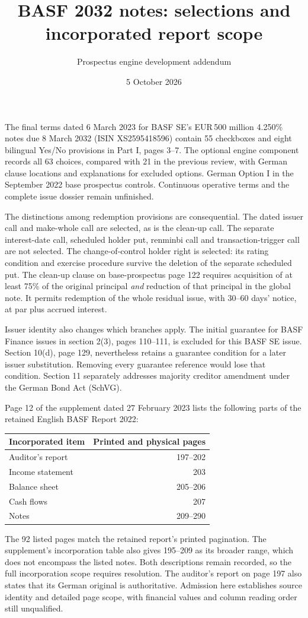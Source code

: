 \documentclass[11pt]{article}
\title{BASF 2032 notes: selections and incorporated report scope}
\author{Prospectus engine development addendum}
\date{5 October 2026}
\begin{document}
\maketitle
The final terms dated 6 March 2023 for BASF SE's EUR\,500 million
4.250\% notes due 8 March 2032 (ISIN XS2595418596) contain 55 checkboxes
and eight bilingual Yes/No provisions in Part I, pages 3--7. The optional
engine component records all 63 choices, compared with 21 in the previous
review, with German clause locations and explanations for excluded
options. German Option I in the September 2022 base prospectus controls.
Continuous operative terms and the complete issue dossier remain unfinished.

The distinctions among redemption provisions are consequential. The
dated issuer call and make-whole call are selected, as is the clean-up
call. The separate interest-date call, scheduled holder put, renminbi
call and transaction-trigger call are not selected. The
change-of-control holder right is selected: its rating condition and
exercise procedure survive the deletion of the separate scheduled put.
The clean-up clause on base-prospectus page 122 requires acquisition of
at least 75\% of the original principal \emph{and} reduction of that
principal in the global note. It permits redemption of the whole
residual issue, with 30--60 days' notice, at par plus accrued interest.

Issuer identity also changes which branches apply. The initial guarantee
for BASF Finance issues in section 2(3), pages 110--111, is excluded for
this BASF SE issue. Section 10(d), page 129, nevertheless retains a
guarantee condition for a later issuer substitution. Removing every
guarantee reference would lose that condition. Section 11 separately
addresses majority creditor amendment under the German Bond Act (SchVG).

Page 12 of the supplement dated 27 February 2023 lists the following
parts of the retained English BASF Report 2022:
\begin{center}
\begin{tabular}{lr}
\toprule
Incorporated item & Printed and physical pages\\
\midrule
Auditor's report &197--202\\
Income statement &203\\
Balance sheet &205--206\\
Cash flows &207\\
Notes &209--290\\
\bottomrule
\end{tabular}
\end{center}
The 92 listed pages match the retained report's printed pagination. The
supplement's incorporation table also gives 195--209 as its broader range,
which does not encompass the listed notes. Both descriptions remain
recorded, so the full incorporation scope requires resolution.
The auditor's report on page 197 also states that its German original
is authoritative. Admission here establishes source identity and
detailed page scope, with financial values and column reading order
still unqualified.
\end{document}
